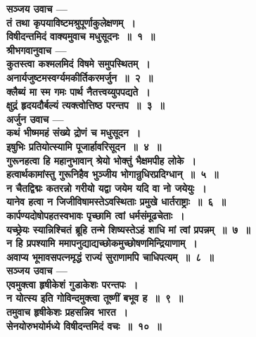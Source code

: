 \begin{center}{\bfseries सञ्जय उवाच —\\तं तथा कृपयाविष्टमश्रुपूर्णाकुलेक्षणम्~।\\विषीदन्तमिदं वाक्यमुवाच मधुसूदनः~॥~१~॥}\\[10pt]
{\bfseries श्रीभगवानुवाच —}\\ 
{\bfseries कुतस्त्वा कश्मलमिदं विषमे समुपस्थितम्~।\\अनार्यजुष्टमस्वर्ग्यमकीर्तिकरमर्जुन~॥~२~॥}\\[10pt]
{\bfseries क्लैब्यं मा स्म गमः पार्थ नैतत्त्वय्युपपद्यते~।\\क्षुद्रं हृदयदौर्बल्यं त्यक्त्वोत्तिष्ठ परन्तप~॥~३~॥}\\[10pt]
{\bfseries अर्जुन उवाच —}\\ 
{\bfseries कथं भीष्ममहं सं‍ख्ये द्रोणं च मधुसूदन~।\\इषुभिः प्रतियोत्स्यामि पूजार्हावरिसूदन~॥~४~॥}\\[10pt]
{\bfseries गुरूनहत्वा हि महानुभावान् श्रेयो भोक्तुं भैक्षमपीह लोके~।\\हत्वार्थकामांस्तु गुरूनिहैव भुञ्जीय भोगान्रुधिरप्रदिग्धान्~॥~५~॥}\\[10pt]
{\bfseries न चैतद्विद्मः कतरन्नो गरीयो यद्वा जयेम यदि वा नो जयेयुः~।\\यानेव हत्वा न जिजीविषामस्तेऽवस्थिताः प्रमुखे धार्तराष्ट्राः~॥~६~॥}\\[10pt]
{\bfseries कार्पण्यदोषोपहतस्वभावः पृच्छामि त्वां धर्मसंमूढचेताः~।\\यच्छ्रेयः स्यान्निश्चितं ब्रूहि तन्मे शिष्यस्तेऽहं शाधि मां त्वां प्रपन्नम्~॥~७~॥}\\[10pt]
{\bfseries न हि प्रपश्यामि ममापनुद्याद्यच्छोकमुच्छोषणमिन्द्रियाणाम्~।\\अवाप्य भूमावसपत्नमृद्धं राज्यं सुराणामपि चाधिपत्यम्~॥~८~॥}\\[10pt]
{\bfseries सञ्जय उवाच —}\\ 
{\bfseries एवमुक्त्वा हृषीकेशं गुडाकेशः परन्तपः~।\\न योत्स्य इति गोविन्दमुक्त्वा तूष्णीं बभूव ह~॥~९~॥}\\[10pt]
{\bfseries तमुवाच हृषीकेशः प्रहसन्निव भारत~।\\सेनयोरुभयोर्मध्ये विषीदन्तमिदं वचः~॥~१०~॥}\end{center}
 
